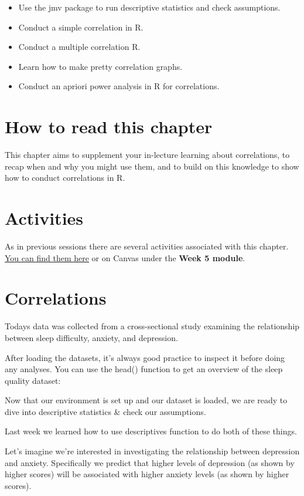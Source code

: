 \documentclass[
]{book}
\begin{document}
\begin{itemize}
\item
  Use the jmv package to run descriptive statistics and check assumptions.
\item
  Conduct a simple correlation in R.
\item
  Conduct a multiple correlation R.
\item
  Learn how to make pretty correlation graphs.
\item
  Conduct an apriori power analysis in R for correlations.
\end{itemize}

\section{How to read this chapter}\label{how-to-read-this-chapter-3}

This chapter aims to supplement your in-lecture learning about correlations, to recap when and why you might use them, and to build on this knowledge to show how to conduct correlations in R.

\section{Activities}\label{activities-3}

As in previous sessions there are several activities associated with this chapter. \href{https://ryandonovan.quarto.pub/week5---activities/}{You can find them here} or on Canvas under the \textbf{Week 5 module}.

\section{Correlations}\label{correlations}

Todays data was collected from a cross-sectional study examining the relationship between sleep difficulty, anxiety, and depression.

After loading the datasets, it's always good practice to inspect it before doing any analyses. You can use the head() function to get an overview of the sleep quality dataset:

Now that our environment is set up and our dataset is loaded, we are ready to dive into descriptive statistics \& check our assumptions.

Last week we learned how to use descriptives function to do both of these things.

Let's imagine we're interested in investigating the relationship between depression and anxiety. Specifically we predict that higher levels of depression (as shown by higher scores) will be associated with higher anxiety levels (as shown by higher scores).
\end{document}
